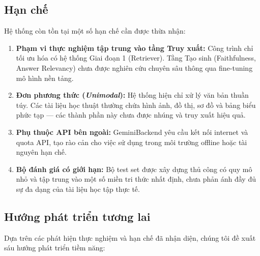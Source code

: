 ﻿\documentclass[12pt]{article}
\begin{document}
\subsection{Hạn chế}

Hệ thống còn tồn tại một số hạn chế cần được thừa nhận:

\begin{enumerate}
    \item \textbf{Phạm vi thực nghiệm tập trung vào tầng Truy xuất:} Công trình chỉ tối ưu hóa có hệ thống Giai đoạn 1 (Retriever). Tầng Tạo sinh (Faithfulness, Answer Relevancy) chưa được nghiên cứu chuyên sâu thông qua fine-tuning mô hình nền tảng.

    \item \textbf{Đơn phương thức (\textit{Unimodal}):} Hệ thống hiện chỉ xử lý văn bản thuần túy. Các tài liệu học thuật thường chứa hình ảnh, đồ thị, sơ đồ và bảng biểu phức tạp --- các thành phần này chưa được nhúng và truy xuất hiệu quả.

    \item \textbf{Phụ thuộc API bên ngoài:} GeminiBackend yêu cầu kết nối internet và quota API, tạo rào cản cho việc sử dụng trong môi trường offline hoặc tài nguyên hạn chế.

    \item \textbf{Bộ đánh giá có giới hạn:} Bộ test set được xây dựng thủ công có quy mô nhỏ và tập trung vào một số miền tri thức nhất định, chưa phản ánh đầy đủ sự đa dạng của tài liệu học tập thực tế.
\end{enumerate}

\subsection{Hướng phát triển tương lai}

Dựa trên các phát hiện thực nghiệm và hạn chế đã nhận diện, chúng tôi đề xuất sáu hướng phát triển tiềm năng:
\end{document}
